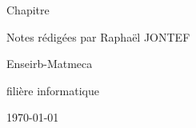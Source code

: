 \documentclass[12pt]{article}
\begin{document}



\hypersetup{pageanchor=false}
\setlength{\headheight}{15pt}
\begin{titlepage}
    \centering
    \vspace*{3cm}
    {\huge Chapitre \numeroChapitre\par}
    {\Huge \bfseries\texteNomChapitre \par} %
    \vspace{2cm}
    {\Large Notes rédigées par Raphaël JONTEF\par}
    \vspace{0.5cm}
    {\normalsize \texteNomProf \par}
    \vspace{4cm}
    {\small Enseirb-Matmeca\par}
    {\small filière informatique\par}
    \vfill
    {\large \today\par}
\end{titlepage}
\hypersetup{pageanchor=true} %

\tableofcontents
\newpage


\section{}

\section{}

\section{}


\section*{}

\end{document}
